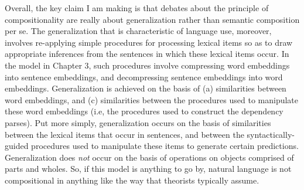 Overall, the key claim I am making is that debates about the principle of compositionality are really about generalization rather than semantic composition per se. The generalization that is characteristic of language use, moreover, involves re-applying simple procedures for processing lexical items so as to draw appropriate inferences from the sentences in which these lexical items occur. In the model in Chapter 3, such procedures involve compressing word embeddings into sentence embeddings, and decompressing sentence embeddings into word embeddings. Generalization is achieved on the basis of (a) similarities between word embeddings, and (c) similarities between the procedures used to manipulate these word embeddings (i.e, the procedures used to construct the dependency parses). Put more simply, generalization occurs on the basis of similarities between the lexical items that occur in sentences, and between the syntactically-guided procedures used to manipulate these items to generate certain predictions. Generalization does \textit{not} occur on the basis of operations on objects comprised of parts and wholes. So, if this model is anything to go by, natural language is not compositional in anything like the way that theorists typically assume. 